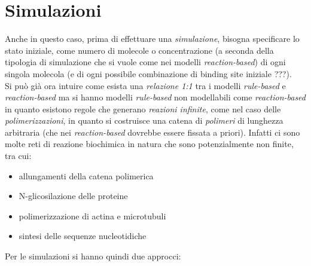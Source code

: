 \documentclass[a4paper,12pt, oneside]{book}
\begin{document}
\section{Simulazioni}
Anche in questo caso, prima di effettuare una \textit{simulazione}, bisogna
specificare lo stato iniziale, come numero di molecole o concentrazione (a
seconda della tipologia di simulazione che si vuole come nei modelli
\textit{reaction-based}) di ogni singola molecola (e di ogni possibile
combinazione di binding site iniziale ???). \\
Si può già ora intuire come esista una \textit{relazione 1:1} tra i modelli
\textit{rule-based} e \textit{reaction-based} ma si hanno modelli
\textit{rule-based} non modellabili come \textit{reaction-based} in quanto
esistono regole che generano \textit{reazioni infinite}, come nel caso delle
\textit{polimerizzazioni}, in quanto si costruisce una catena di
\textit{polimeri} di lunghezza arbitraria (che nei \textit{reaction-based}
dovrebbe essere fissata a priori). Infatti ci sono molte reti di reazione
biochimica in natura che sono potenzialmente non finite, tra cui:
\begin{itemize}
  \item allungamenti della catena polimerica
  \item N-glicosilazione delle proteine
  \item polimerizzazione di actina e microtubuli
  \item sintesi delle sequenze nucleotidiche
\end{itemize}
Per le simulazioni si hanno quindi due approcci:
\end{document}
